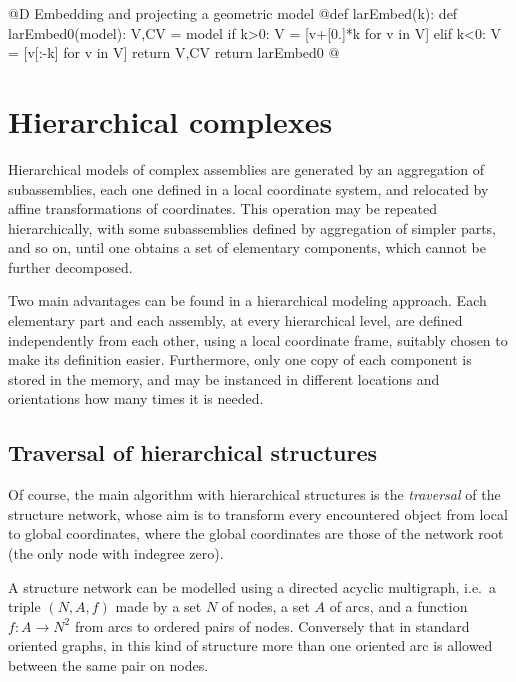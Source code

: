 \documentclass[11pt,oneside]{article}    %
\begin{document}
@D Embedding and projecting a geometric model
@{def larEmbed(k):
    def larEmbed0(model):
        V,CV = model
        if k>0:
            V = [v+[0.]*k for v in V] 
        elif k<0:
            V = [v[:-k] for v in V] 
        return V,CV
    return larEmbed0
@}

\section{Hierarchical complexes}
Hierarchical models of complex assemblies are generated by an aggregation
of subassemblies, each one defined in a local coordinate system, and
relocated by affine transformations of coordinates.  This operation
may be repeated hierarchically, with some subassemblies defined by
aggregation of simpler parts, and so on, until one obtains a set of
elementary components, which cannot be further decomposed.

Two main advantages can be found in a hierarchical modeling approach. Each elementary part and each assembly, at every hierarchical level, are defined independently from each other, using a local coordinate frame, suitably chosen to make its definition easier. Furthermore, only one copy of each component is stored in the memory, and may be instanced in different locations and orientations how many times it is needed.

\subsection{Traversal of hierarchical structures}

Of course, the main algorithm with hierarchical structures is the \emph{traversal} of the structure network, whose aim is to transform every encountered object from local to global coordinates, where the global coordinates are those of the network root (the only node with indegree zero).

A structure network can be modelled using a directed acyclic multigraph, i.e.~a triple $(N,A,f)$
made by a set $N$ of nodes, a set $A$ of arcs, and a function $f:A \to N^2$ from arcs to ordered pairs of nodes. Conversely that in standard oriented graphs, in this kind of structure more than one oriented arc is allowed between the same pair on nodes.
\end{document}
